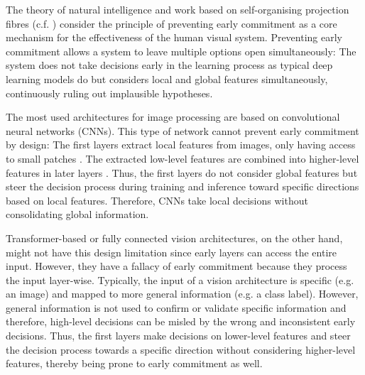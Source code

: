 The theory of natural intelligence  and work based on self-organising projection fibres \cite{bienenstock_neural_1987, lades_distortion_1993, wiskott_face_1996, wiskott_face_1997, wolfrum_recurrent_2008, fernandes_self-organization_2015} (c.f. ) consider the principle of preventing early commitment as a core mechanism for the effectiveness of the human visual system.
Preventing early commitment allows a system to leave multiple options open simultaneously: The system does not take decisions early in the learning process as typical deep learning models do but considers local and global features simultaneously, continuously ruling out implausible hypotheses.

The most used architectures for image processing are based on convolutional neural networks  (CNNs). This type of network cannot prevent early commitment by design: The first layers extract local features from images, only having access to small patches \cite{lecun_backpropagation_1989}. The extracted low-level features are combined into higher-level features in later layers . Thus, the first layers do not consider global features but steer the decision process during training and inference toward specific directions based on local features. Therefore, CNNs take local decisions without consolidating global information.

Transformer-based  or fully connected  vision architectures, on the other hand, might not have this design limitation since early layers can access the entire input.
However, they have a fallacy of early commitment because they process the input layer-wise. Typically, the input of a vision architecture is specific (e.g. an image) and mapped to more general information (e.g. a class label).
However, general information is not used to confirm or validate specific information and therefore, high-level decisions can be misled by the wrong and inconsistent early decisions.
Thus, the first layers make decisions on lower-level features and steer the decision process towards a specific direction without considering higher-level features, thereby being prone to early commitment as well.


